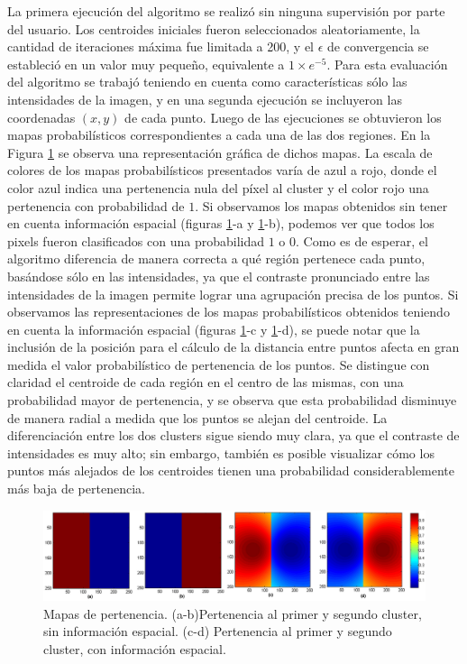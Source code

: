 La primera ejecución del algoritmo se realizó sin ninguna supervisión por parte del usuario. Los centroides iniciales fueron seleccionados aleatoriamente, la cantidad de iteraciones máxima fue limitada a 200, y el $\epsilon$ de convergencia se estableció en un valor muy pequeño, equivalente a $1 \times e^{-5}$. Para esta evaluación del algoritmo se trabajó teniendo en cuenta como características sólo las intensidades de la imagen, y en una segunda ejecución se incluyeron las coordenadas $(x,y)$ de cada punto. Luego de las ejecuciones se obtuvieron los mapas probabilísticos correspondientes a cada una de las dos regiones. En la Figura \ref{fig:ejecucion1_mitad_mitad} se observa una representación gráfica de dichos mapas. La escala de colores de los mapas probabilísticos presentados varía de azul a rojo, donde el color azul indica una pertenencia nula del píxel al cluster y el color rojo una pertenencia con probabilidad de $1$.
Si observamos los mapas obtenidos sin tener en cuenta información espacial (figuras \ref{fig:ejecucion1_mitad_mitad}-a y \ref{fig:ejecucion1_mitad_mitad}-b), podemos ver que todos los pixels fueron clasificados con una probabilidad $1$ o $0$. Como es de esperar, el algoritmo diferencia de manera correcta a qué región pertenece cada punto, basándose sólo en las intensidades, ya que el contraste pronunciado entre las intensidades de la imagen permite lograr una agrupación precisa de los puntos.
Si observamos las representaciones de los mapas probabilísticos obtenidos teniendo en cuenta la información espacial (figuras \ref{fig:ejecucion1_mitad_mitad}-c y \ref{fig:ejecucion1_mitad_mitad}-d), se puede notar que la inclusión de la posición para el cálculo de la distancia entre puntos afecta en gran medida el valor probabilístico de pertenencia de los puntos. Se distingue con claridad el centroide de cada región en el centro de las mismas, con una probabilidad mayor de pertenencia, y se observa que esta probabilidad disminuye de manera radial a medida que los puntos se alejan del centroide. La diferenciación entre los dos clusters sigue siendo muy clara, ya que el contraste de intensidades es muy alto; sin embargo, también es posible visualizar cómo los puntos más alejados de los centroides tienen una probabilidad considerablemente más baja de pertenencia. 

\begin{figure}[H]
\centering
\includegraphics[scale=0.08]{images/mitad_mitad_001.jpg}
\caption{Mapas de pertenencia. (a-b)Pertenencia al primer y segundo cluster, sin información espacial. (c-d) Pertenencia al primer y segundo cluster, con información espacial.}
\label{fig:ejecucion1_mitad_mitad}
\end{figure}

